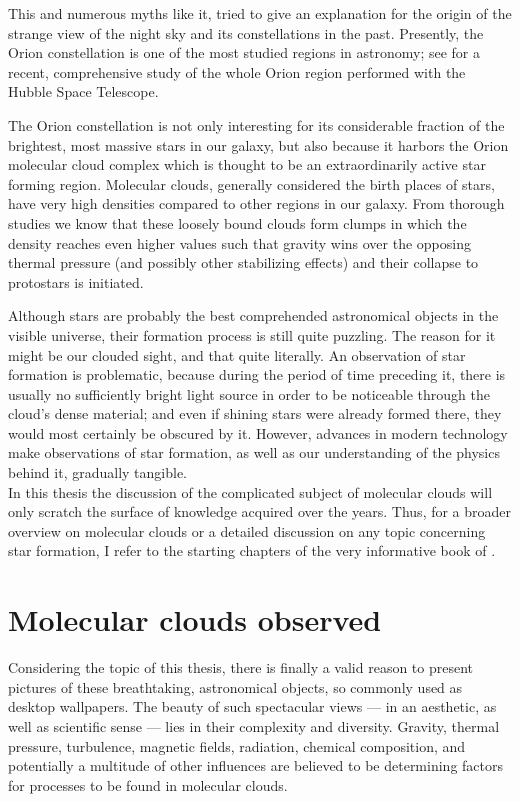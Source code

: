 This and numerous myths like it, tried to give an explanation for the origin of the strange view of the night sky and its constellations in the past.
Presently, the Orion constellation is one of the most studied regions in astronomy; see \citet{Orion_Survey} for a recent, comprehensive study of the whole Orion region performed with the Hubble Space Telescope.

The Orion constellation is not only interesting for its considerable fraction of the brightest, most massive stars in our galaxy, but also because it harbors the Orion molecular cloud complex which is thought to be an extraordinarily active star forming region.
Molecular clouds, generally considered the birth places of stars, have very high densities compared to other regions in our galaxy.
From thorough studies we know that these loosely bound clouds form clumps in which the density reaches even higher values such that gravity wins over the opposing thermal pressure (and possibly other stabilizing effects) and their collapse to protostars is initiated.

Although stars are probably the best comprehended astronomical objects in the visible universe, their formation process is still quite puzzling.
The reason for it might be our clouded sight, and that quite literally.
An observation of star formation is problematic, because during the period of time preceding it, there is usually no sufficiently bright light source in order to be noticeable through the cloud's dense material; and even if shining stars were already formed there, they would most certainly be obscured by it.
However, advances in modern technology make observations of star formation, as well as our understanding of the physics behind it, gradually tangible.
\\[6pt]
%
In this thesis the discussion of the complicated subject of molecular clouds will only scratch the surface of knowledge acquired over the years.
Thus, for a broader overview on molecular clouds or a detailed discussion on any topic concerning star formation, I refer to the starting chapters of the very informative book of \citet{Stahler_Palla}.

\section{Molecular clouds observed}
\label{sec:MolecularClouds}
Considering the topic of this thesis, there is finally a valid reason to present pictures of these breathtaking, astronomical objects, so commonly used as desktop wallpapers.
The beauty of such spectacular views --- in an aesthetic, as well as scientific sense --- lies in their complexity and diversity.
Gravity, thermal pressure, turbulence, magnetic fields, radiation, chemical composition, and potentially a multitude of other influences are believed to be determining factors for processes to be found in molecular clouds.


